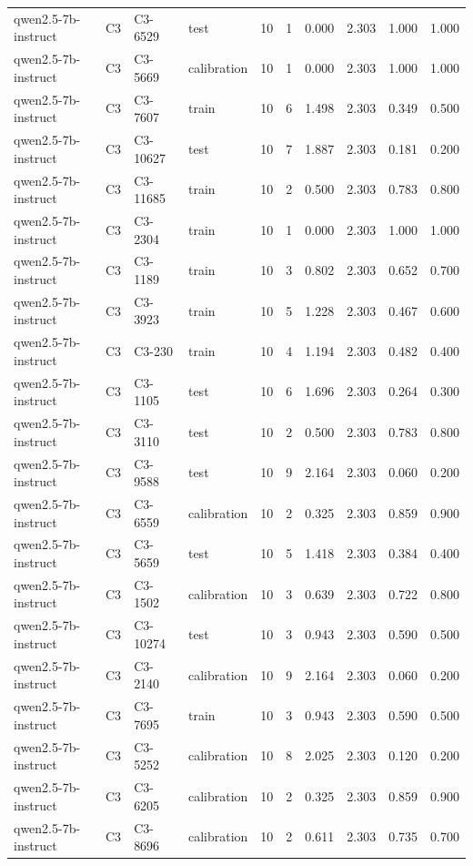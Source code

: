 \begin{table}
\begin{tabular}{llllrrrrrr}
qwen2.5-7b-instruct & C3 & C3-6529 & test & 10 & 1 & 0.000 & 2.303 & 1.000 & 1.000 \\
qwen2.5-7b-instruct & C3 & C3-5669 & calibration & 10 & 1 & 0.000 & 2.303 & 1.000 & 1.000 \\
qwen2.5-7b-instruct & C3 & C3-7607 & train & 10 & 6 & 1.498 & 2.303 & 0.349 & 0.500 \\
qwen2.5-7b-instruct & C3 & C3-10627 & test & 10 & 7 & 1.887 & 2.303 & 0.181 & 0.200 \\
qwen2.5-7b-instruct & C3 & C3-11685 & train & 10 & 2 & 0.500 & 2.303 & 0.783 & 0.800 \\
qwen2.5-7b-instruct & C3 & C3-2304 & train & 10 & 1 & 0.000 & 2.303 & 1.000 & 1.000 \\
qwen2.5-7b-instruct & C3 & C3-1189 & train & 10 & 3 & 0.802 & 2.303 & 0.652 & 0.700 \\
qwen2.5-7b-instruct & C3 & C3-3923 & train & 10 & 5 & 1.228 & 2.303 & 0.467 & 0.600 \\
qwen2.5-7b-instruct & C3 & C3-230 & train & 10 & 4 & 1.194 & 2.303 & 0.482 & 0.400 \\
qwen2.5-7b-instruct & C3 & C3-1105 & test & 10 & 6 & 1.696 & 2.303 & 0.264 & 0.300 \\
qwen2.5-7b-instruct & C3 & C3-3110 & test & 10 & 2 & 0.500 & 2.303 & 0.783 & 0.800 \\
qwen2.5-7b-instruct & C3 & C3-9588 & test & 10 & 9 & 2.164 & 2.303 & 0.060 & 0.200 \\
qwen2.5-7b-instruct & C3 & C3-6559 & calibration & 10 & 2 & 0.325 & 2.303 & 0.859 & 0.900 \\
qwen2.5-7b-instruct & C3 & C3-5659 & test & 10 & 5 & 1.418 & 2.303 & 0.384 & 0.400 \\
qwen2.5-7b-instruct & C3 & C3-1502 & calibration & 10 & 3 & 0.639 & 2.303 & 0.722 & 0.800 \\
qwen2.5-7b-instruct & C3 & C3-10274 & test & 10 & 3 & 0.943 & 2.303 & 0.590 & 0.500 \\
qwen2.5-7b-instruct & C3 & C3-2140 & calibration & 10 & 9 & 2.164 & 2.303 & 0.060 & 0.200 \\
qwen2.5-7b-instruct & C3 & C3-7695 & train & 10 & 3 & 0.943 & 2.303 & 0.590 & 0.500 \\
qwen2.5-7b-instruct & C3 & C3-5252 & calibration & 10 & 8 & 2.025 & 2.303 & 0.120 & 0.200 \\
qwen2.5-7b-instruct & C3 & C3-6205 & calibration & 10 & 2 & 0.325 & 2.303 & 0.859 & 0.900 \\
qwen2.5-7b-instruct & C3 & C3-8696 & calibration & 10 & 2 & 0.611 & 2.303 & 0.735 & 0.700 \\

\end{tabular}
\end{table}
